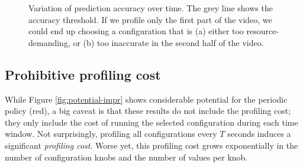 \begin{figure}[t!]
    \centering
    \hspace{-0.5cm}
    \caption{Variation of prediction accuracy over time. The grey line shows the accuracy threshold. If we profile only the first part of the video, we could end up choosing a configuration that is (a) either too resource-demanding, or (b) too inaccurate in the second half of the video.}
    \label{fig:time-variation}
\end{figure}


\subsection{Prohibitive profiling cost}
\label{subsec:profiling-cost}

While Figure \ref{fig:potential-impr} shows considerable potential for the periodic policy (red), a big caveat is that these results do not include the profiling cost; they only include the cost of running the selected configuration during each time window. Not surprisingly, profiling all configurations every $T$ seconds induces a significant {\em profiling cost}. Worse yet, this profiling cost grows exponentially in the number of configuration knobs and the number of values per knob.

